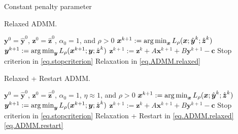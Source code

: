 \documentclass[8pt,red]{beamer}
\theoremstyle{plain}
\theoremstyle{definition}
\theoremstyle{remark}
\newcommand{\refalg}[1]{Algorithm~\ref{#1}}
\newcommand{\argmin}{\operatornamewithlimits{\mathrm{arg\,min}}}
\newcommand{\bi}[1]{\ensuremath{\boldsymbol{#1}}}
\begin{document}
\begin{frame}{Constant penalty parameter}
\begin{algorithm}[H]
  \scriptsize
  \caption{Relaxed ADMM.}
  \label{alg:prototype.cp-R}
  \begin{algorithmic}[1]
    \Require
    $\bi{y}^{0} = \hat{\bi{y}}^{0}$, $\bi{z}^{0}=\hat{\bi{z}}^{0}$, $\alpha_{0}=1$, and $\rho > 0$ 
    \State
    $\bi{x}^{k+1} 
    := \argmin_{\bi{x}} L_{\rho}(\bi{x};\hat{\bi{y}}^{k};\hat{\bi{z}}^{k})$ 
    \State
    $\bi{y}^{k+1} 
    := \argmin_{\bi{y}} L_{\rho}(\bi{x}^{k+1};\bi{y};\hat{\bi{z}}^{k})$ 
    \State
    $\bi{z}^{k+1} 
  := \bi{z}^{k} + A \bi{x}^{k+1} + B \bi{y}^{k+1} - \bi{c}$ 
    \State
    Stop criterion in \eqref{eq.stopcriterion}
    \State
    Relaxation in \eqref{eq.ADMM.relaxed}
    \EndFor
  \end{algorithmic}
\end{algorithm}

\begin{algorithm}[H]
  \scriptsize
  \caption{Relaxed + Restart ADMM.}
  \label{alg:prototype.cp-RR}
  \begin{algorithmic}[1]
    \Require
    $\bi{y}^{0} = \hat{\bi{y}}^{0}$, $\bi{z}^{0}=\hat{\bi{z}}^{0}$, 
    $\alpha_{0}=1$, $\eta \approx 1$, and $\rho > 0$ 
    \State
    $\bi{x}^{k+1} 
    := \argmin_{\bi{x}} L_{\rho}(\bi{x};\hat{\bi{y}}^{k};\hat{\bi{z}}^{k})$ 
    \State
    $\bi{y}^{k+1} 
    := \argmin_{\bi{y}} L_{\rho}(\bi{x}^{k+1};\bi{y};\hat{\bi{z}}^{k})$ 
    \State
    $\bi{z}^{k+1} 
  := \bi{z}^{k} + A \bi{x}^{k+1} + B \bi{y}^{k+1} - \bi{c}$ 
    \State
    Stop criterion in \eqref{eq.stopcriterion} 
    \State
	Relaxation + Restart in \eqref{eq.ADMM.relaxed} \eqref{eq.ADMM.restart}
    \EndFor
  \end{algorithmic}
\end{algorithm}
\end{frame}
\end{document}
